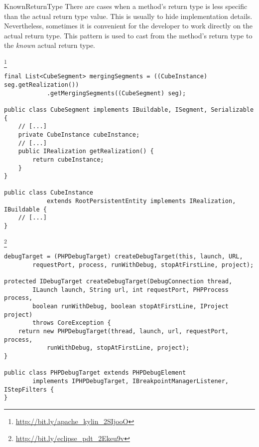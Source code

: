 \begin{pattern}{KnownReturnType}
There are cases when a method's return type is less specific than the
actual return type value.
This is usually to hide implementation details.
Nevertheless, sometimes it is convenient for the developer to work
directly on the actual return type.
%
%
This pattern is used to cast from the method's return type to
the \emph{known} actual return type.

\instances{}

\footnote{\url{http://bit.ly/apache_kylin_2SIjooO}}


\begin{verbatim}
final List<CubeSegment> mergingSegments = ((CubeInstance) seg.getRealization())
            .getMergingSegments((CubeSegment) seg);

public class CubeSegment implements IBuildable, ISegment, Serializable {
    // [...]
    private CubeInstance cubeInstance;
    // [...]
    public IRealization getRealization() {
        return cubeInstance;
    }
}

public class CubeInstance
            extends RootPersistentEntity implements IRealization, IBuildable {
    // [...]
}
\end{verbatim}


\footnote{\url{http://bit.ly/eclipse_pdt_2Ekeu9v}}

\begin{verbatim}
debugTarget = (PHPDebugTarget) createDebugTarget(this, launch, URL,
        requestPort, process, runWithDebug, stopAtFirstLine, project);

protected IDebugTarget createDebugTarget(DebugConnection thread,
        ILaunch launch, String url, int requestPort, PHPProcess process,
        boolean runWithDebug, boolean stopAtFirstLine, IProject project)
        throws CoreException {
    return new PHPDebugTarget(thread, launch, url, requestPort, process,
            runWithDebug, stopAtFirstLine, project);
}

public class PHPDebugTarget extends PHPDebugElement
        implements IPHPDebugTarget, IBreakpointManagerListener, IStepFilters {
}
\end{verbatim}


\end{pattern}
